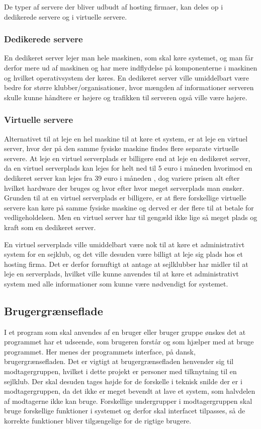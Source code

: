 De typer af servere der bliver udbudt af hosting firmaer, kan deles op i dedikerede servere og i virtuelle servere.
\subsubsection*{Dedikerede servere}
En dedikeret server lejer man hele maskinen, som skal køre systemet, og man får derfor mere ud af maskinen og har mere indflydelse på komponenterne i maskinen og hvilket operativsystem der køres.
En dedikeret server ville umiddelbart være bedre for større klubber/organisationer, hvor mængden af informationer serveren skulle kunne håndtere er højere og trafikken til serveren også ville være højere. \citep{server}
\subsubsection*{Virtuelle servere}
Alternativet til at leje en hel maskine til at køre et system, er at leje en virtuel server, hvor der på den samme fysiske maskine findes flere separate virtuelle servere. At leje en virtuel serverplads er billigere end at leje en dedikeret server, da en virtuel serverplads kan lejes for helt ned til 5 euro i måneden\citep{Virtuelserver} hvorimod en dedikeret server kan lejes fra 39 euro i måneden \citep{Dedikeretserver}, dog variere prisen alt efter hvilket hardware der bruges og hvor efter hvor meget serverplads man ønsker. 
Grunden til at en virtuel serverplads er billigere, er at flere forskellige virtuelle servere kan køre på samme fysiske maskine og derved er der flere til at betale for vedligeholdelsen. 
Men en virtuel server har til gengæld ikke lige så meget plads og kraft som en dedikeret server.\citep{server} 

En virtuel serverplads ville umiddelbart være nok til at køre et administrativt system for en sejklub, og det ville desuden være billigt at leje sig plads hos et hosting firma. 
Det er derfor fornuftigt at antage at sejlklubber har midler til at leje en serverplads, hvilket ville kunne anvendes til at køre et administrativt system med alle informationer som kunne være nødvendigt for systemet. 
\subsection*{Brugergrænseflade}
I et program som skal anvendes af en bruger eller bruger gruppe ønskes det at programmet har et udseende, som brugeren forstår og som hjælper med at bruge programmet.
Her menes der programmets interface, på dansk, brugergrænsefladen.
Det er vigtigt at brugergrænsefladen henvender sig til modtagergruppen, hvilket i dette projekt er personer med tilknytning til en sejlklub.
Der skal desuden tages højde for de forskelle i teknisk snilde der er i modtagergruppen, da det ikke er meget bevendt at lave et system, som halvdelen af modtagerne ikke kan bruge.
Forskellige undergrupper i modtagergruppen skal bruge forskellige funktioner i systemet og derfor skal interfacet tilpasses, så de korrekte funktioner bliver tilgængelige for de rigtige brugere.


